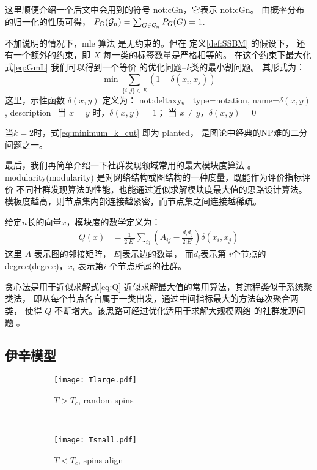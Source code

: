 这里顺便介绍一个后文中会用到的符号 \gls{not:cGn}，它表示
\glsdesc{not:cGn}。
由概率分布的归一化的性质可得，
$P_G(\mathcal{G}_n) = \sum_{G\in \mathcal{G}_n}P_G(G)=1$.

不加说明的情况下，\gls{mle} 算法 是无约束的。但在
定义\ref{def:SSBM} 的假设下，
还有一个额外的约束，即 $X$ 每一类的标签数量是严格相等的。
在这个约束下最大化式\eqref{eq:GmL} 我们可以得到一个等价
的优化问题--$k$类的最小割问题。
其形式为：
\begin{equation}\label{eq:minimum_k_cut}
  \min \sum_{ \{i,j\} \in E} (1-\delta(x_i, x_j))
\end{equation}
这里，示性函数 $\delta(x,y)$ 定义为：
\glsdesc{not:deltaxy}。
{
  type=notation,
  name={$\delta(x,y)$},
  description={当 $x=y$ 时，$\delta(x,y) = 1$； 当 $x\neq y$，$\delta(x,y)=0$}
}

当$k=2$时，式\eqref{eq:minimum_k_cut} 即为 \gls{planted}，
是图论中经典的NP难的二分问题之一。

最后，我们再简单介绍一下社群发现领域常用的最大模块度算法
\cite{newman2006modularity}。
\gls{modularity}(\glsdesc{modularity})
是对网络结构或图结构的一种度量，既能作为评价指标评价
不同社群发现算法的性能，也能通过近似求解模块度最大值的思路设计算法。
模板度越高，则节点集内部连接越紧密，而节点集之间连接越稀疏。

给定$n$长的向量$x$，模块度的数学定义为：
\begin{align}\label{eq:Q}
  Q(x) &= \frac{1}{2 |E|} \sum_{ij} (A_{ij} - \frac{d_i d_j}{2 |E|}) \delta(x_i, x_j)
\end{align}
这里 $A$ 表示图的邻接矩阵，$|E|$表示边的数量，
而$d_i$表示第
$i$个节点的\gls{degree}(\glsdesc{degree})，$x_i$ 表示第$i$
个节点所属的社群。

贪心法是用于近似求解式\eqref{eq:Q}
近似求解最大值的常用算法，其流程类似于系统聚类法，
即从每个节点各自属于一类出发，通过中间指标最大的方法每次聚合两类，
使得 $Q$ 不断增大。该思路可经过优化适用于求解大规模网络
的社群发现问题 \cite{clauset2004finding}。


\subsection{伊辛模型}\label{sec:ising}
\begin{figure}
	\centering
	\begin{subfigure}{0.5\textwidth}
		\texttt{[image: Tlarge.pdf]}
		\caption{$T>T_c$, random spins}
	\end{subfigure}~
	\begin{subfigure}{0.5\textwidth}
		\texttt{[image: Tsmall.pdf]}
		\caption{$T<T_c$, spins align}
	\end{subfigure}
  \caption{}\label{fig:ising_two_configurations}
\end{figure}   

